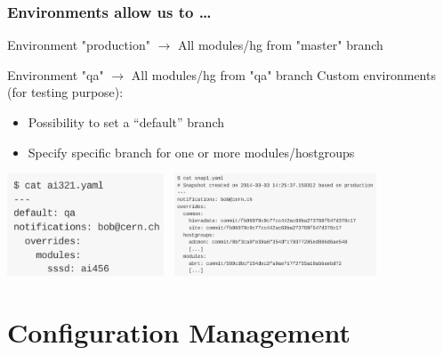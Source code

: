 \documentclass[aspectratio=169]{beamer}
\begin{document}
\begin{frame}

    \frametitle{Environments allow us to \ldots}

    Environment "production"
        $\rightarrow$ All modules/hg from "master" branch

    Environment "qa"
        $\rightarrow$ All modules/hg from "qa" branch
    \newline
    \newline
    Custom environments (for testing purpose):
    \begin{itemize}
        \item Possibility to set a “default” branch
        \item Specify specific branch for one or more modules/hostgroups
    \end{itemize}
    \begin{center}
        \includegraphics[width=0.35\textwidth]{Env_example.png} \,
        \includegraphics[width=0.45\textwidth]{Env_example_commit.png}
    \end{center}

\end{frame}

\section{Configuration Management}
\end{document}
